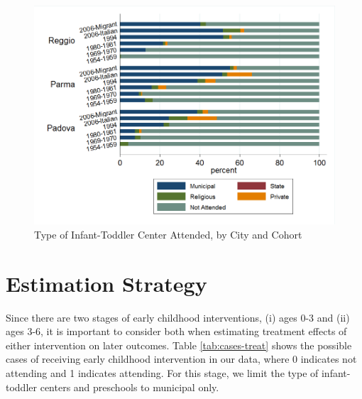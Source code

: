 \begin{landscape}
\begin{figure}[H]
\caption{Type of Infant-Toddler Center Attended, by City and Cohort} \label{fig:attended-itc}
\includegraphics[scale=0.63]{../../../../output/image/asiloType-Attend.png} 
\end{figure}
\end{landscape}


\section{Estimation Strategy} \label{sec:estimation}

Since there are two stages of early childhood interventions, (i) ages 0-3 and (ii) ages 3-6, it is important to consider both when estimating treatment effects of either intervention on later outcomes. Table \ref{tab:cases-treat} shows the possible cases of receiving early childhood intervention in our data, where 0 indicates not attending and 1 indicates attending. For this stage, we limit the type of infant-toddler centers and preschools to municipal only. 

